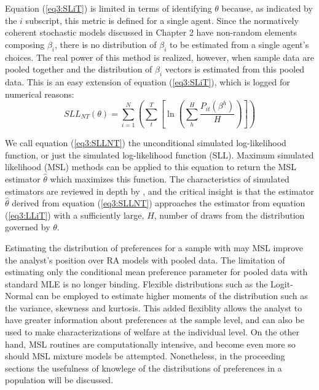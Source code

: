 \documentclass[../main.tex]{subfiles}
\begin{document}
Equation (\ref{eq3:SLiT}) is limited in terms of identifying $\theta$ because, as indicated by the $i$ subscript, this metric is defined for a single agent.
Since the normatively coherent stochastic models discussed in Chapter 2 have non-random elements composing $\beta_i$, there is no distribution of $\beta_i$ to be estimated from a single agent's choices.
The real power of this method is realized, however, when sample data are pooled together and the distribution of $\beta_i$ vectors is estimated from this pooled data.
This is an easy extension of equation (\ref{eq3:SLiT}), which is logged for numerical reasons:
\begin{equation}
	\label{eq3:SLLNT}
	\mathit{SLL}_{NT}(\theta) = \sum_{i=1}^N \left( \sum_t^T \left[ \ln\!\left( \sum_h^H \frac{ P_{it}(\beta^h) }{H} \right) \right] \right)
\end{equation}

\noindent We call equation (\ref{eq3:SLLNT}) the unconditional simulated log-likelihood function, or just the simulated log-likelihood function (SLL).
Maximum simulated likelihood (MSL) methods can be applied to this equation to return the MSL estimator $\hat{\theta}$ which maximizes this function.
The characteristics of simulated estimators are reviewed in depth by \textcite[Chapter~10]{Train2002}, and the critical insight is that the estimator $\hat{\theta}$ derived from equation (\ref{eq3:SLLNT}) approaches the estimator from equation (\ref{eq3:LLiT}) with a sufficiently large, $H$, number of draws from the distribution governed by $\theta$.

Estimating the distribution of preferences for a sample with may MSL improve the analyst's position over RA models with pooled data.
The limitation of estimating only the conditional mean preference parameter for pooled data with standard MLE is no longer binding.
Flexible distributions such as the Logit-Normal{\footnotemark} can be employed to estimate higher moments of the distribution such as the variance, skewness and kurtosis.
This added flexiblity allows the analyst to have greater information about preferences at the sample level, and can also be used to make characterizations of welfare at the individual level.
On the other hand, MSL routines are computationally intensive, and become even more so should MSL mixture models be attempted.
Nonetheless, in the proceeding sections the usefulness of knowlege of the distributions of preferences in a population will be discussed.

\addtocounter{footnote}{-1}
\end{document}
